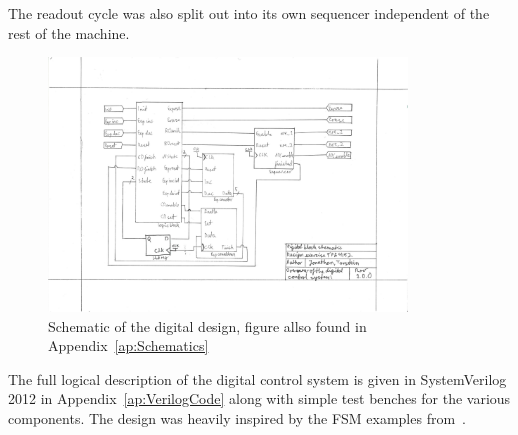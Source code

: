 The readout cycle was also split out into its own sequencer independent of the rest of the machine.

\begin{figure}[htbp]
  \centering
  \includegraphics[width=0.85\textwidth]{figures/SchematicDigital}
  \caption{Schematic of the digital design, figure allso found in Appendix~\ref{ap:Schematics}}
  \label{fig:digschematic}
\end{figure}

The full logical description of the digital control system is given in SystemVerilog 2012 in Appendix~\ref{ap:VerilogCode} along with simple test benches for the various components.
The design was heavily inspired by the FSM examples from~\cite{DigitalBook}.